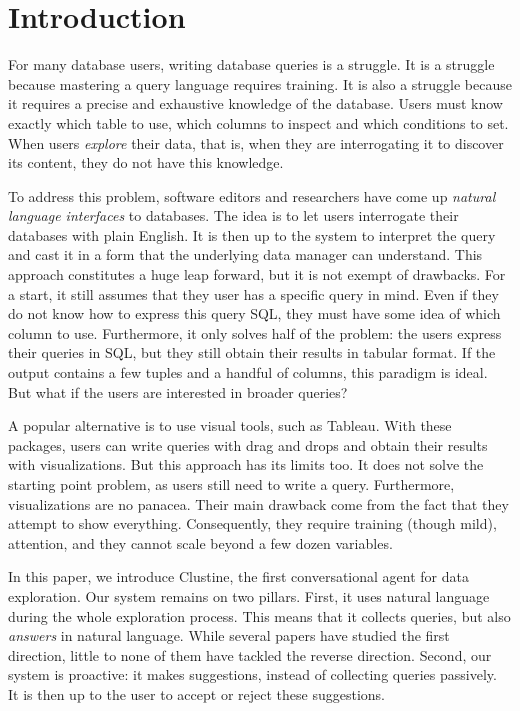 \section{Introduction}
\label{sec:intro}

For many database users, writing database queries is a struggle. It is a
struggle because mastering a query language requires training. It is also a
struggle because it requires a precise and exhaustive knowledge of the
database. Users must know exactly which table to use, which columns to inspect
and which conditions to set. When users \emph{explore} their data, that is,
when they are interrogating it to discover its content, they do not have this
knowledge.

To address this problem, software editors and researchers have come up
\emph{natural language interfaces} to databases. The idea is to let users
interrogate their databases with plain English. It is then up to the system to
interpret the query and cast it in a form that the underlying data manager can
understand. This approach constitutes a huge leap forward, but it is not exempt
of drawbacks. For a start, it still assumes that they user has a specific query
in mind. Even if they do not know how to express this query SQL, they must have
some idea of which column to use. Furthermore, it only solves half  of the
problem: the users express their queries in SQL, but they still obtain their
results in tabular format. If the output contains a few tuples and a handful of
columns, this paradigm is ideal. But what if the users are interested in
broader queries?

A popular alternative is to use visual tools, such as Tableau. With these
packages, users can write queries with drag and drops and obtain their results
with visualizations. But this approach has its limits too. It does not solve
the starting point problem, as users still need to write a query. Furthermore,
visualizations are no panacea. Their main drawback come from the fact that they
attempt to show everything. Consequently, they require training (though mild),
attention, and they cannot scale beyond a few dozen variables.

In this paper, we introduce Clustine, the first conversational agent for data
exploration. Our system remains on two pillars. First, it uses natural language
during the whole exploration process. This means that it collects queries, but
also \emph{answers} in natural language. While several papers have studied the
first direction, little to none of them have tackled the reverse direction.
Second, our system is proactive: it makes suggestions, instead of collecting
queries passively. It is then up to the user to accept or reject these
suggestions.

